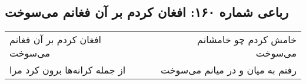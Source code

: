 \begin{center}
\section*{رباعی شماره ۱۶۰: افغان کردم بر آن فغانم می‌سوخت}
\label{sec:0160}
\begin{longtable}{l p{0.5cm} r}
افغان کردم بر آن فغانم می‌سوخت
&&
خامش کردم چو خامشانم می‌سوخت
\\
از جمله کرانه‌ها برون کرد مرا
&&
رفتم به میان و در میانم می‌سوخت
\\
\end{longtable}
\end{center}
